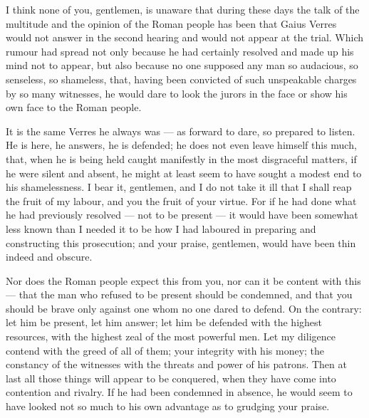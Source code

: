%

 I think none of you, gentlemen, is unaware that during these days the talk of the multitude and the opinion of the Roman people has been that Gaius Verres would not answer in the second hearing and would not appear at the trial. Which rumour had spread not only because he had certainly resolved and made up his mind not to appear, but also because no one supposed any man so audacious, so senseless, so shameless, that, having been convicted of such unspeakable charges by so many witnesses, he would dare to look the jurors in the face or show his own face to the Roman people.

 It is the same Verres he always was --- as forward to dare, so prepared to listen. He is here, he answers, he is defended; he does not even leave himself this much, that, when he is being held caught manifestly in the most disgraceful matters, if he were silent and absent, he might at least seem to have sought a modest end to his shamelessness. I bear it, gentlemen, and I do not take it ill that I shall reap the fruit of my labour, and you the fruit of your virtue. For if he had done what he had previously resolved --- not to be present --- it would have been somewhat less known than I needed it to be how I had laboured in preparing and constructing this prosecution; and your praise, gentlemen, would have been thin indeed and obscure.

 Nor does the Roman people expect this from you, nor can it be content with this --- that the man who refused to be present should be condemned, and that you should be brave only against one whom no one dared to defend. On the contrary: let him be present, let him answer; let him be defended with the highest resources, with the highest zeal of the most powerful men. Let my diligence contend with the greed of all of them; your integrity with his money; the constancy of the witnesses with the threats and power of his patrons. Then at last all those things will appear to be conquered, when they have come into contention and rivalry. If he had been condemned in absence, he would seem to have looked not so much to his own advantage as to grudging your praise.

